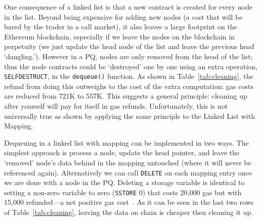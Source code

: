 %
%
%
%
%



One consequence of a linked list is that a new contract is created for every node in the list. Beyond being expensive for adding new nodes (a cost that will be bared by the trader in a call market), it also leaves a large footprint on the Ethereum blockchain, especially if we leave the nodes on the blockchain in perpetuity (\ie we just update the head node of the list and leave the previous head `dangling.'). However in a PQ, nodes are only removed from the head of the list; thus the node contracts could be `destroyed' one by one using an extra operation, \texttt{SELFDESTRUCT}, in the \texttt{dequeue()} function. As shown in Table~\ref{tab:cleaning}, the refund from doing this outweighs to the cost of the extra computation: gas costs are reduced from 721K to 557K.  This suggests a general principle: cleaning up after yourself will pay for itself in gas refunds. Unfortunately, this is not universally true as shown by applying the same principle to the Linked List with Mapping. 

Dequeuing in a linked list with mapping can be implemented in two ways. The simplest approach is process a node, update the head pointer, and leave the `removed' node's data behind in the mapping untouched (where it will never be referenced again). Alternatively we can call \texttt{DELETE} on each mapping entry once we are done with a node in the PQ. Deleting a storage variable is identical to setting a non-zero variable to zero (\texttt{SSTORE} 0) that costs 20,000 gas but with 15,000 refunded---a net positive gas cost~\cite{wood2014ethereum}. As it can be seen in the last two rows of Table~\ref{tab:cleaning}, leaving the data on chain is cheaper then cleaning it up.

